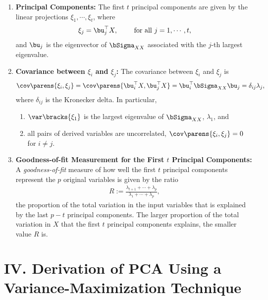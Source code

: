 \documentclass[12pt]{article}
\begin{document}
\begin{enumerate}[label=\textbf{\arabic*.}]
%	
	
	\item \textbf{Principal Components:} The first $t$ principal components are given by the linear projections $\xi_1, \cdots, \xi_t$, where
	\begin{align*}
		\xi_j = \bu_j^\top X, \qquad \text{ for all } j = 1, \cdots, t,
	\end{align*}
	and $\bu_j$ is the eigenvector of $\bSigma_{XX}$ associated with the $j$-th largest eigenvalue. 
	
	\item \textbf{Covariance between $\xi_i$ and $\xi_j$:} The covariance between $\xi_i$ and $\xi_j$ is
	\begin{align*}
		\cov \parens{\xi_i, \xi_j} = \cov \parens{\bu_i^\top X, \bu_j^\top X} = \bu_i^\top \bSigma_{XX} \bu_j = \delta_{ij} \lambda_j,
	\end{align*}
	where $\delta_{ij}$ is the Kronecker delta. In particular, 
	\begin{enumerate}
		\item $\var \bracks{\xi_1}$ is the largest eigenvalue of $\bSigma_{XX}$, $\lambda_1$, and 
		\item all pairs of derived variables are uncorrelated, $\cov \parens{\xi_i, \xi_j} = 0$ for $i \neq j$. 
	\end{enumerate}
	
	\item \textbf{Goodness-of-fit Measurement for the First $t$ Principal Components:} A \textit{goodness-of-fit} measure of how well the first $t$ principal components represent the $p$ original variables is given by the ratio
	\begin{align}\label{eq-goodness}
		R := \frac{\lambda_{t+1} + \cdots + \lambda_p}{\lambda_1 + \cdots + \lambda_p},
	\end{align}
	the proportion of the total variation in the input variables that is explained by the last $p-t$ principal components. The larger proportion of the total variation in $X$ that the first $t$ principal components explains, the smaller value $R$ is. 

\end{enumerate}


\section*{IV. Derivation of PCA Using a Variance-Maximization Technique}
\end{document}

